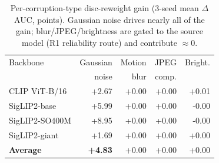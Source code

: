 \begin{table}[t]
\centering
\caption{Per-corruption-type disc-reweight gain (3-seed mean $\Delta$AUC, points). Gaussian noise drives nearly all of the gain; blur/JPEG/brightness are gated to the source model (R1 reliability route) and contribute $\approx 0$.}
\label{tab:tta_breakdown}
\begin{tabular}{lrrrr}
\toprule
Backbone & Gaussian & Motion & JPEG & Bright. \\
 & noise & blur & comp. & \\
\midrule
CLIP ViT-B/16 & +2.67 & +0.00 & +0.00 & +0.01 \\
SigLIP2-base & +5.99 & +0.00 & +0.00 & -0.00 \\
SigLIP2-SO400M & +8.95 & +0.00 & +0.00 & -0.00 \\
SigLIP2-giant & +1.69 & +0.00 & +0.00 & +0.00 \\
\midrule
\textbf{Average} & \textbf{+4.83} & +0.00 & +0.00 & +0.00 \\
\bottomrule
\end{tabular}
\end{table}
